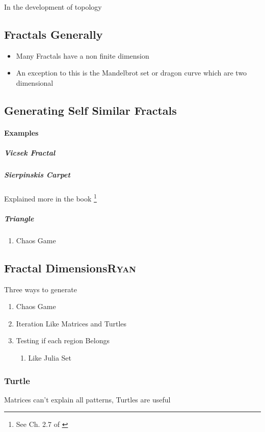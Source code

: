 \documentclass[11pt]{article}
\begin{document}
In the development of topology
\subsection{Fractals Generally}
\label{sec:org4cecc02}
\begin{itemize}
\item Many Fractals have a non finite dimension
\item An exception to this is the Mandelbrot set or dragon curve which are two dimensional
\end{itemize}
\subsection{Generating Self Similar Fractals}
\label{sec:org41fef05}
\paragraph{Examples}
\label{sec:org0f8dde3}
\subparagraph{Vicsek Fractal}
\label{sec:org7fde20e}
\subparagraph{Sierpinskis Carpet}
\label{sec:org0892eec}

Explained more in the book \footnote{See Ch. 2.7 of \cite[Ch. 2.7]{peitgenChaosFractalsNew2004}}
\subparagraph{Triangle}
\label{sec:orgdfca15c}
\begin{enumerate}
\item Chaos Game
\label{sec:org283be66}
\end{enumerate}
\subsection{Fractal Dimensions\hfill{}\textsc{Ryan}}
\label{sec:orgb41d15c}
Three ways to generate

\begin{enumerate}
\item Chaos Game
\item Iteration Like Matrices and Turtles
\item Testing if each region Belongs
\begin{enumerate}
\item Like Julia Set
\end{enumerate}
\end{enumerate}

\subsubsection{Turtle}
\label{sec:orgc102ec1}
Matrices can't explain all patterns, Turtles are useful
\end{document}
